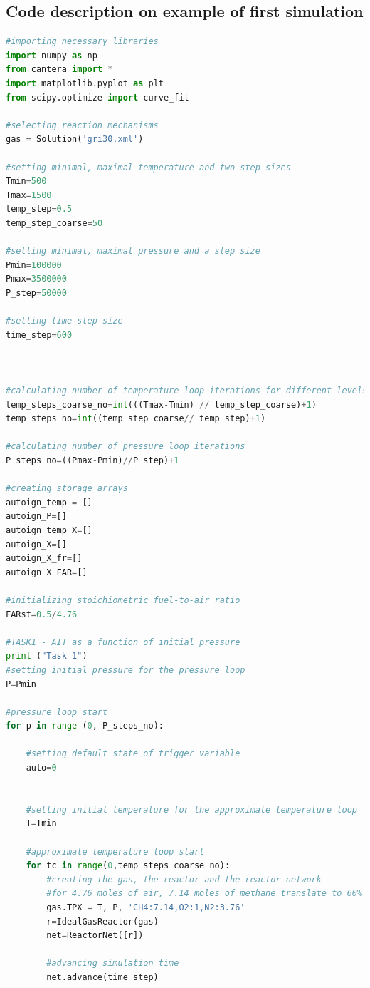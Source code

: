 \documentclass[a4paper,11pt]{article}
\begin{document}
         \subsection{Code description on example of first simulation}
         
         
\begin{lstlisting}[language=Python]
#importing necessary libraries
import numpy as np 
from cantera import *
import matplotlib.pyplot as plt
from scipy.optimize import curve_fit

#selecting reaction mechanisms
gas = Solution('gri30.xml')

#setting minimal, maximal temperature and two step sizes
Tmin=500
Tmax=1500
temp_step=0.5
temp_step_coarse=50

#setting minimal, maximal pressure and a step size
Pmin=100000
Pmax=3500000
P_step=50000

#setting time step size
time_step=600



#calculating number of temperature loop iterations for different levels of precision
temp_steps_coarse_no=int(((Tmax-Tmin) // temp_step_coarse)+1)
temp_steps_no=int((temp_step_coarse// temp_step)+1)

#calculating number of pressure loop iterations
P_steps_no=((Pmax-Pmin)//P_step)+1

#creating storage arrays
autoign_temp = []
autoign_P=[]
autoign_temp_X=[]
autoign_X=[]
autoign_X_fr=[]
autoign_X_FAR=[]

#initializing stoichiometric fuel-to-air ratio
FARst=0.5/4.76

#TASK1 - AIT as a function of initial pressure
print ("Task 1")
#setting initial pressure for the pressure loop
P=Pmin

#pressure loop start
for p in range (0, P_steps_no):  
    
    #setting default state of trigger variable
    auto=0 
    
    
    #setting initial temperature for the approximate temperature loop
    T=Tmin
    
    #approximate temperature loop start
    for tc in range(0,temp_steps_coarse_no):
        #creating the gas, the reactor and the reactor network
        #for 4.76 moles of air, 7.14 moles of methane translate to 60% molar fraction
        gas.TPX = T, P, 'CH4:7.14,O2:1,N2:3.76'
        r=IdealGasReactor(gas)
        net=ReactorNet([r])
        
        #advancing simulation time 
        net.advance(time_step)
         

\end{lstlisting}
\end{document}
